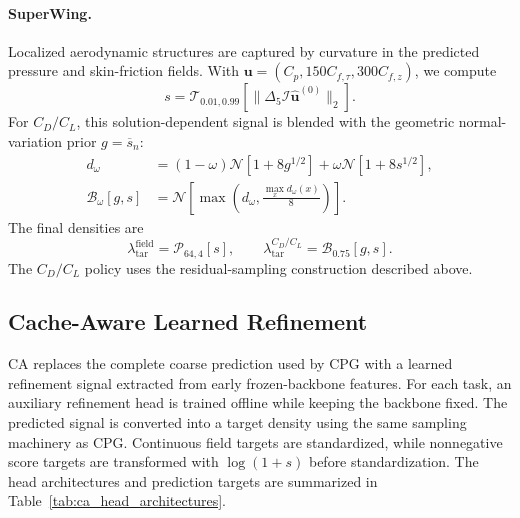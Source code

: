 \paragraph{SuperWing.}
Localized aerodynamic structures are captured by curvature in the predicted
pressure and skin-friction fields. With
$\mathbf u=(C_p,150C_{f,\tau},300C_{f,z})$, we compute
\[
    s
    =\mathcal{T}_{0.01,0.99}
       \left[
       \|\Delta_5\mathcal{I}
       \widehat{\mathbf u}^{(0)}\|_2
       \right].
\]
For $C_D/C_L$, this solution-dependent signal is blended with the geometric
normal-variation prior $g=\overline{s}_n$:
\begin{equation}
    \begin{aligned}
    d_\omega
       &=(1-\omega)\mathcal{N}[1+8g^{1/2}]
        +\omega\mathcal{N}[1+8s^{1/2}],\\
    \mathcal{B}_\omega[g,s]
       &=\mathcal{N}\!\left[
          \max\!\left(
          d_\omega,
          \frac{\max_x d_\omega(x)}{8}
          \right)
          \right].
    \end{aligned}
    \label{eq:app_density_wing_blend}
\end{equation}
The final densities are
\begin{equation}
    \lambda_{\mathrm{tar}}^{\mathrm{field}}
    =\mathcal{P}_{64,4}[s],
    \qquad
    \lambda_{\mathrm{tar}}^{C_D/C_L}
    =\mathcal{B}_{0.75}[g,s].
    \label{eq:app_cpg_superwing_density}
\end{equation}
The $C_D/C_L$ policy uses the residual-sampling construction described above.


\subsection{Cache-Aware Learned Refinement}
\label{app:ca_density_design}

CA replaces the complete coarse prediction used by CPG with a learned
refinement signal extracted from early frozen-backbone features. For each task,
an auxiliary refinement head is trained offline while keeping the backbone
fixed. The predicted signal is converted into a target density using the same
sampling machinery as CPG. Continuous field targets are standardized, while
nonnegative score targets are transformed with $\log(1+s)$ before
standardization. The head architectures and prediction targets are summarized
in Table~\ref{tab:ca_head_architectures}.

